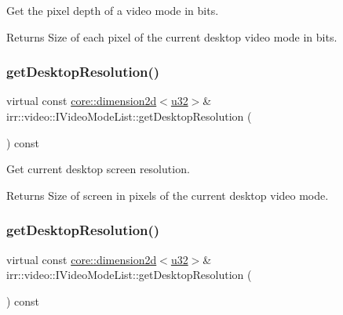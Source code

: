 Get the pixel depth of a video mode in bits. 

\begin{DoxyReturn}{Returns}
Size of each pixel of the current desktop video mode in bits. 
\end{DoxyReturn}
\mbox{\label{classirr_1_1video_1_1IVideoModeList_ade99f99922307c1d539bdd35834361fa}} 
\subsubsection{\texorpdfstring{get\+Desktop\+Resolution()}{getDesktopResolution()}\hspace{0.1cm}{\footnotesize\ttfamily [1/2]}}
{\footnotesize\ttfamily virtual const \hyperlink{classirr_1_1core_1_1dimension2d}{core\+::dimension2d}$<$\hyperlink{namespaceirr_a0416a53257075833e7002efd0a18e804}{u32}$>$\& irr\+::video\+::\+I\+Video\+Mode\+List\+::get\+Desktop\+Resolution (\begin{DoxyParamCaption}{ }\end{DoxyParamCaption}) const\hspace{0.3cm}{\ttfamily [pure virtual]}}



Get current desktop screen resolution. 

\begin{DoxyReturn}{Returns}
Size of screen in pixels of the current desktop video mode. 
\end{DoxyReturn}
\mbox{\label{classirr_1_1video_1_1IVideoModeList_ade99f99922307c1d539bdd35834361fa}} 
\subsubsection{\texorpdfstring{get\+Desktop\+Resolution()}{getDesktopResolution()}\hspace{0.1cm}{\footnotesize\ttfamily [2/2]}}
{\footnotesize\ttfamily virtual const \hyperlink{classirr_1_1core_1_1dimension2d}{core\+::dimension2d}$<$\hyperlink{namespaceirr_a0416a53257075833e7002efd0a18e804}{u32}$>$\& irr\+::video\+::\+I\+Video\+Mode\+List\+::get\+Desktop\+Resolution (\begin{DoxyParamCaption}{ }\end{DoxyParamCaption}) const\hspace{0.3cm}{\ttfamily [pure virtual]}}



